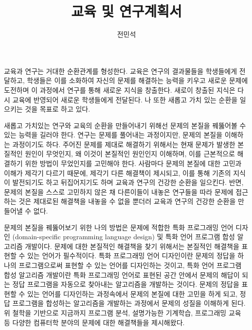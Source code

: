 \documentclass[11pt]{article}
\begin{document}
\title{교육 및 연구계획서}

\author{전민석}



\newcommand{\DisjunctiveModel}{\textsc{Disjunctive Model}}
\newcommand{\FeatureLanguage}{\textsc{Feature Language}}
\newcommand{\GDL}{\textsc{Graph Description Language}}
\newcommand{\PLXGL}{\textsc{PL4XGL}}


\newcommand{\AbstractRelativeWritePattern}{\textsc{Abstract Relative Write Pattern}}





\maketitle 
\begin{spacing}{1.145}

교육과 연구는 거대한 순환관계를 형성한다. 
%
교육은 연구의 결과물들을 학생들에게 전달하고, 학생들은 이를 소화하여 자신의 문제를 해결하는 능력을 키우고 새로운 문제에 도전하며 이 과정에서 연구를 통해 새로운 지식을 창출한다. 새로이 창출된 지식은 다시 교육에 반영되어 새로운 학생들에게 전달된다.
%
나 또한 새롭고 가치 있는 순환을 일으키는 것을 목표로 하고 있다.



새롭고 가치있는 연구와 교육의 순환을 만들어내기 위해선 문제의 본질을 꿰뚫어볼 수 있는 능력을 길러야 한다.
%
연구는 문제를 풀어내는 과정이지만, 문제의 본질을 이해하는 과정이기도 하다. 
%
주어진 문제를 제대로 해결하기 위해서는 현재 문제가 발생한 본질적인 원인이 무엇인지, 왜 이것이 본질적인 원인인지 이해하며, 이를 근본적으로 해결하기 위한 방법이 무었인지를 고민해야 한다.
%
사람마다 문제의 본질에 대한 고민과 이해가 제각기 다르기 때문에, 제각기 다른 해결책이 제시되고, 이를 통해 기존의 지식이 발전되기도 하고 뒤집어지기도 하며 교육과 연구의 건강한 순환을 일으킨다.
%
반면, 문제의 본질을 스스로 고민하지 않은 채 다른이들이 내놓은 연구들을 따라 문제에 접근하는 것은 제대로된 해결책을 내놓을 수 없을 뿐더러 교육과 연구의 건강한 순환을 만들어낼 수 없다.



문제의 본질을 꿰뚫어보기 위한 나의 방법은 문제에 적합한 특화 프로그래밍 언어 디자인 (domain-specific programming language design) 및 특화 언어 프로그램 합성 알고리즘 개발이다.
% 
문제에 대한 본질적인 해결책을 찾기 위해서는 본질적인 해결책을 표현할 수 있는 언어가 필수적이다.
% 
특화 프로그래밍 언어 디자인이란 문제의 정답을 하나의 프로그램으로써 표현할 수 있는 언어를 디자인하는 것이고, 특화 언어 프로그램 합성 알고리즘 개발이란 특화 프로그래밍 언어로 표현된 공간 안에서 문제의 해답이 되는 정답 프로그램을 자동으로 찾아내는 알고리즘을 개발하는 것이다.
% 
문제의 정답을 표현할 수 있는 언어를 디자인하는 과정속에서 문제의 본질에 대한 고민을 하게 되고, 정답 프로그램을 합성하는 알고리즘을 개발하는 과정에서 문제의 성질을 이해하게 된다.
%
위 철학을 기반으로 지금까지 프로그램 분석, 설명가능한 기계학습, 프로그래밍 교육 등 다양한 컴퓨터학 분야의 문제에 대한 해결책들을 제시해왔다.
%



\end{spacing}
\end{document}
